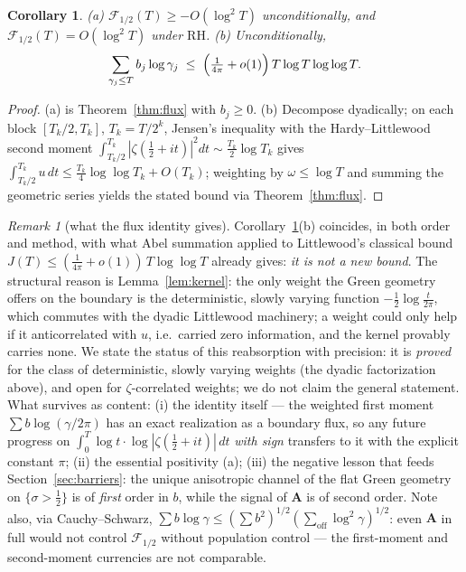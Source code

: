 \documentclass[11pt]{amsart}
\theoremstyle{plain}
\newtheorem{corollary}[theorem]{Corollary}
\theoremstyle{definition}
\theoremstyle{remark}
\newtheorem{remark}[theorem]{Remark}
\newcommand{\RH}{\mathrm{RH}}
\newcommand{\Aax}{\mathbf{A}}
\begin{document}
\begin{corollary}\label{cor:fluxbounds}
\textup{(a)} $\mathcal F_{1/2}(T)\ge-O(\log^2T)$ unconditionally, and $\mathcal F_{1/2}(T)=O(\log^2T)$ under $\RH$.
\textup{(b)} Unconditionally,
\[
\sum_{\gamma_j\le T} b_j\log\gamma_j\;\le\;\Bigl(\tfrac1{4\pi}+o(1)\Bigr)\,T\log T\log\log T .
\]
\end{corollary}

\begin{proof}
(a) is Theorem~\ref{thm:flux} with $b_j\ge0$. (b) Decompose dyadically; on each block $[T_k/2,T_k]$, $T_k=T/2^k$, Jensen's inequality with the Hardy--Littlewood second moment $\int_{T_k/2}^{T_k}|\zeta(\tfrac12+it)|^2dt\sim\tfrac{T_k}2\log T_k$ \cite{HardyLittlewood1918} gives $\int_{T_k/2}^{T_k}u\,dt\le\frac{T_k}{4}\log\log T_k+O(T_k)$; weighting by $\omega\le\log T$ and summing the geometric series yields the stated bound via Theorem~\ref{thm:flux}.
\end{proof}

\begin{remark}[what the flux identity gives]\label{rem:fluxverdict}
Corollary~\ref{cor:fluxbounds}(b) coincides, in both order and method, with what Abel summation applied to Littlewood's classical bound $J(T)\le(\tfrac1{4\pi}+o(1))\,T\log\log T$ \cite{Littlewood1924} already gives: \emph{it is not a new bound}. The structural reason is Lemma~\ref{lem:kernel}: the only weight the Green geometry offers on the boundary is the deterministic, slowly varying function $-\tfrac12\log\frac t{2\pi}$, which commutes with the dyadic Littlewood machinery; a weight could only help if it anticorrelated with $u$, i.e.\ carried zero information, and the kernel provably carries none. We state the status of this reabsorption with precision: it is \emph{proved} for the class of deterministic, slowly varying weights (the dyadic factorization above), and open for $\zeta$-correlated weights; we do not claim the general statement. What survives as content: (i) the identity itself --- the weighted first moment $\sum b\log(\gamma/2\pi)$ has an exact realization as a boundary flux, so any future progress on $\int_0^T\log t\cdot\log|\zeta(\tfrac12+it)|\,dt$ \emph{with sign} transfers to it with the explicit constant $\pi$; (ii) the essential positivity (a); (iii) the negative lesson that feeds Section~\ref{sec:barriers}: the unique anisotropic channel of the flat Green geometry on $\{\sigma>\tfrac12\}$ is of \emph{first} order in $b$, while the signal of $\Aax$ is of second order. Note also, via Cauchy--Schwarz, $\sum b\log\gamma\le(\sum b^2)^{1/2}(\sum_{\mathrm{off}}\log^2\gamma)^{1/2}$: even $\Aax$ in full would not control $\mathcal F_{1/2}$ without population control --- the first-moment and second-moment currencies are not comparable.
\end{remark}
\end{document}
